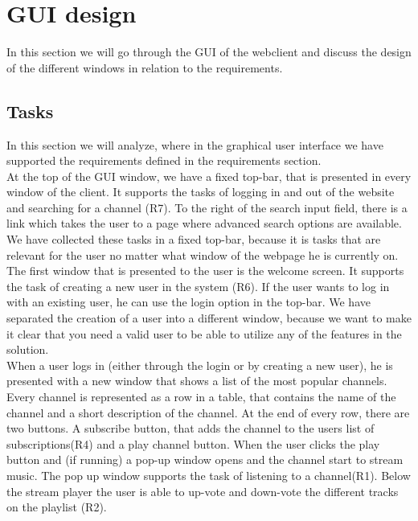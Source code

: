 \documentclass[a4paper,11pt,report]{article}
\begin{document}
\section{GUI design}
In this section we will go through the GUI of the webclient and discuss the design of the different windows in relation to the requirements.

\subsection{Tasks}
In this section we will analyze, where in the graphical user interface we have supported the requirements defined in the requirements section.\\

At the top of the GUI window, we have a fixed top-bar, that is presented in every window of the client. It supports the tasks of logging in and out of the website and searching for a channel (R7). To the right of the search input field, there is a link which takes the user to a page where advanced search options are available. We have collected these tasks in a fixed top-bar, because it is tasks that are relevant for the user no matter what window of the webpage he is currently on.\\

The first window that is presented to the user is the welcome screen. It supports the task of creating a new user in the system (R6). If the user wants to log in with an existing user, he can use the login option in the top-bar. We have separated the creation of a user into a different window, because we want to make it clear that you need a valid user to be able to utilize any of the features in the solution.\\

When a user logs in (either through the login or by creating a new user), he is presented with a new window that shows a list of the most popular channels. Every channel is represented as a row in a table, that contains the name of the channel and a short description of the channel. At the end of every row, there are two buttons. A subscribe button, that adds the channel to the users list of subscriptions(R4) and a play channel button. When the user clicks the play button and (if running) a pop-up window opens and the channel start to stream music. The pop up window supports the task of listening to a channel(R1). Below the stream player the user is able to up-vote and down-vote the different tracks on the playlist (R2).\\
\end{document}
